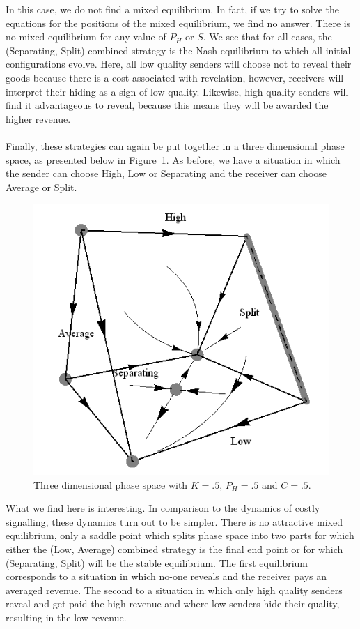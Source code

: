 \documentclass[a4paper,10pt]{article}
\numberwithin{equation}{section}
\begin{document}
In this case, we do not find a mixed equilibrium. In fact, if we try to solve the equations for the positions of the mixed equilibrium, we find no answer. There is no mixed equilibrium for any value of $P_H$ or $S$. We see that for all cases, the (Separating, Split) combined strategy is the Nash equilibrium to which all initial configurations evolve. Here, all low quality senders will choose not to reveal their goods because there is a cost associated with revelation, however, receivers will interpret their hiding as a sign of low quality. Likewise, high quality senders will find it advantageous to reveal, because this means they will be awarded the higher revenue.\\
\\
Finally, these strategies can again be put together in a three dimensional phase space, as presented below in Figure~\ref{fig:Graph20.png}. As before, we have a situation in which the sender can choose High, Low or Separating and the receiver can choose Average or Split.

\begin{figure}[h]
\begin{center}
\leavevmode
\includegraphics[scale=.75]{Graph20.png}
\end{center}
\caption{Three dimensional phase space with $K=.5$, $P_H=.5$ and $C=.5$.}
\label{fig:Graph20.png}
\end{figure}

What we find here is interesting. In comparison to the dynamics of costly signalling, these dynamics turn out to be simpler. There is no attractive mixed equilibrium, only a saddle point which splits phase space into two parts for which either the (Low, Average) combined strategy is the final end point or for which (Separating, Split) will be the stable equilibrium. The first equilibrium corresponds to a situation in which no-one reveals and the receiver pays an averaged revenue. The second to a situation in which only high quality senders reveal and get paid the high revenue and where low senders hide their quality, resulting in the low revenue.
\end{document}
